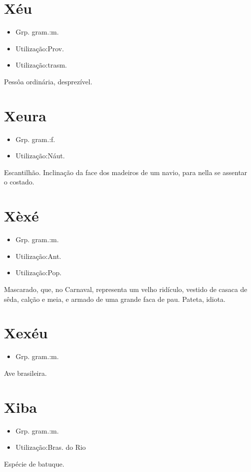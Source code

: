 \section{Xéu}
\begin{itemize}
\item {Grp. gram.:m.}
\end{itemize}
\begin{itemize}
\item {Utilização:Prov.}
\end{itemize}
\begin{itemize}
\item {Utilização:trasm.}
\end{itemize}
Pessôa ordinária, desprezível.
\section{Xeura}
\begin{itemize}
\item {Grp. gram.:f.}
\end{itemize}
\begin{itemize}
\item {Utilização:Náut.}
\end{itemize}
Escantilhão.
Inclinação da face dos madeiros de um navio, para nella se assentar o costado.
\section{Xèxé}
\begin{itemize}
\item {Grp. gram.:m.}
\end{itemize}
\begin{itemize}
\item {Utilização:Ant.}
\end{itemize}
\begin{itemize}
\item {Utilização:Pop.}
\end{itemize}
Mascarado, que, no Carnaval, representa um velho ridículo, vestido de casaca de sêda, calção e meia, e armado de uma grande faca de pau.
Pateta, idiota.
\section{Xexéu}
\begin{itemize}
\item {Grp. gram.:m.}
\end{itemize}
Ave brasileira.
\section{Xiba}
\begin{itemize}
\item {Grp. gram.:m.}
\end{itemize}
\begin{itemize}
\item {Utilização:Bras. do Rio}
\end{itemize}
Espécie de batuque.
